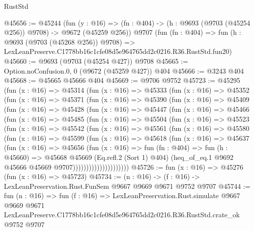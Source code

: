 \begin{lexlean}{RustStd}
\begin{coremodule}
@45656 := @45244
    (fun (y : @16) => (fn : @404) -> (h : @9693 (@9703 (@45254 @256)) @9708) -> @9672 (@45259 @256))
    @9707
    (fun (fn : @404) =>
    fun (h : @9693 (@9703 (@45268 @256)) @9708) =>
    LexLeanPreserve.C1778bb16c1cfe08d5e964765dd2c0216.R36.RustStd.fun20)
@45660 := @9693 (@9703 (@45254 @427)) @9708
@45665 := Option.noConfusion.{0, 0} (@9672 (@45259 @427)) @404
@45666 := @3243 @404
@45668 := @45665 @45666 @404
@45669 := @9706 @9752
@45723 := @45295
    (fun (x : @16) =>
    @45314
      (fun (x : @16) =>
      @45333
        (fun (x : @16) =>
        @45352
          (fun (x : @16) =>
          @45371
            (fun (x : @16) =>
            @45390
              (fun (x : @16) =>
              @45409
                (fun (x : @16) =>
                @45428
                  (fun (x : @16) =>
                  @45447
                    (fun (x : @16) =>
                    @45466
                      (fun (x : @16) =>
                      @45485
                        (fun (x : @16) =>
                        @45504
                          (fun (x : @16) =>
                          @45523
                            (fun (x : @16) =>
                            @45542
                              (fun (x : @16) =>
                              @45561
                                (fun (x : @16) =>
                                @45580
                                  (fun (x : @16) =>
                                  @45599
                                    (fun (x : @16) =>
                                    @45618
                                      (fun (x : @16) =>
                                      @45637
                                        (fun (x : @16) =>
                                        @45656
                                          (fun (x : @16) =>
                                          fun (fn : @404) =>
                                          fun (h : @45660) =>
                                          @45668
                                            @45669
                                            (Eq.refl.{2} (Sort 1) @404)
                                            (heq_of_eq.{1}
                                              @9692
                                              @45666
                                              @45669
                                              @9707)))))))))))))))))))))
@45726 := fun (x : @16) => @45276 (fun (x : @16) => @45723)
@45734 := (n : @16) -> (f : @16) -> LexLeanPreservation.Rust.FunSem @9667 @9669 @9671 @9752 @9707
@45744 := fun (n : @16) =>
  fun (f : @16) =>
  LexLeanPreservation.Rust.simulate
    @9667
    @9669
    @9671
    LexLeanPreserve.C1778bb16c1cfe08d5e964765dd2c0216.R36.RustStd.crate_ok
    @9752
    @9707
\end{coremodule}
\end{lexlean}
